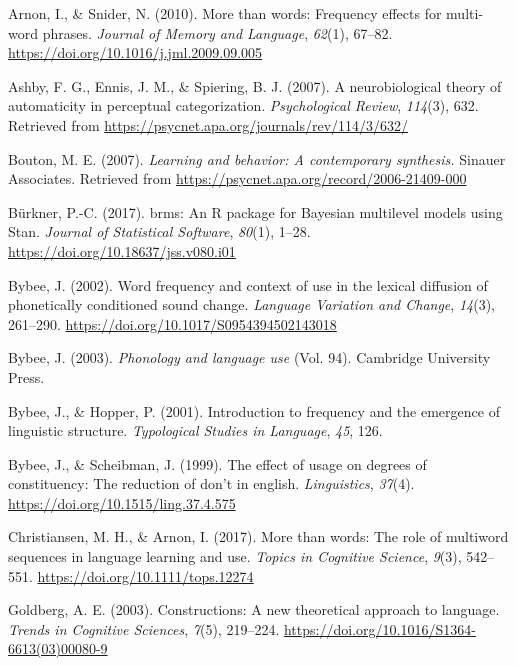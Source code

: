 \documentclass[
  man,floatsintext]{apa6}
\newlength{\cslhangindent}
\newenvironment{CSLReferences}[2] %
 {\begin{list}{}{%
  \setlength{\itemindent}{0pt}
  \setlength{\leftmargin}{0pt}
  \setlength{\parsep}{0pt}
  \ifodd #1
   \setlength{\leftmargin}{\cslhangindent}
   \setlength{\itemindent}{-1\cslhangindent}
  \fi
  \setlength{\itemsep}{#2\baselineskip}}}
 {\end{list}}
\begin{document}
\label{refs}
\begin{CSLReferences}{1}{0}
Arnon, I., \& Snider, N. (2010). More than words: Frequency effects for multi-word phrases. \emph{Journal of Memory and Language}, \emph{62}(1), 67--82. \url{https://doi.org/10.1016/j.jml.2009.09.005}

Ashby, F. G., Ennis, J. M., \& Spiering, B. J. (2007). A neurobiological theory of automaticity in perceptual categorization. \emph{Psychological Review}, \emph{114}(3), 632. Retrieved from \url{https://psycnet.apa.org/journals/rev/114/3/632/}

Bouton, M. E. (2007). \emph{Learning and behavior: A contemporary synthesis.} Sinauer Associates. Retrieved from \url{https://psycnet.apa.org/record/2006-21409-000}

Bürkner, P.-C. (2017). {brms}: An {R} package for {Bayesian} multilevel models using {Stan}. \emph{Journal of Statistical Software}, \emph{80}(1), 1--28. \url{https://doi.org/10.18637/jss.v080.i01}

Bybee, J. (2002). Word frequency and context of use in the lexical diffusion of phonetically conditioned sound change. \emph{Language Variation and Change}, \emph{14}(3), 261--290. \url{https://doi.org/10.1017/S0954394502143018}

Bybee, J. (2003). \emph{Phonology and language use} (Vol. 94). Cambridge University Press.

Bybee, J., \& Hopper, P. (2001). Introduction to frequency and the emergence of linguistic structure. \emph{Typological Studies in Language}, \emph{45}, 126.

Bybee, J., \& Scheibman, J. (1999). The effect of usage on degrees of constituency: The reduction of don't in english. \emph{Linguistics}, \emph{37}(4). \url{https://doi.org/10.1515/ling.37.4.575}

Christiansen, M. H., \& Arnon, I. (2017). More than words: The role of multiword sequences in language learning and use. \emph{Topics in Cognitive Science}, \emph{9}(3), 542--551. \url{https://doi.org/10.1111/tops.12274}

Goldberg, A. E. (2003). Constructions: A new theoretical approach to language. \emph{Trends in Cognitive Sciences}, \emph{7}(5), 219--224. \url{https://doi.org/10.1016/S1364-6613(03)00080-9}


\end{CSLReferences}
\end{document}
